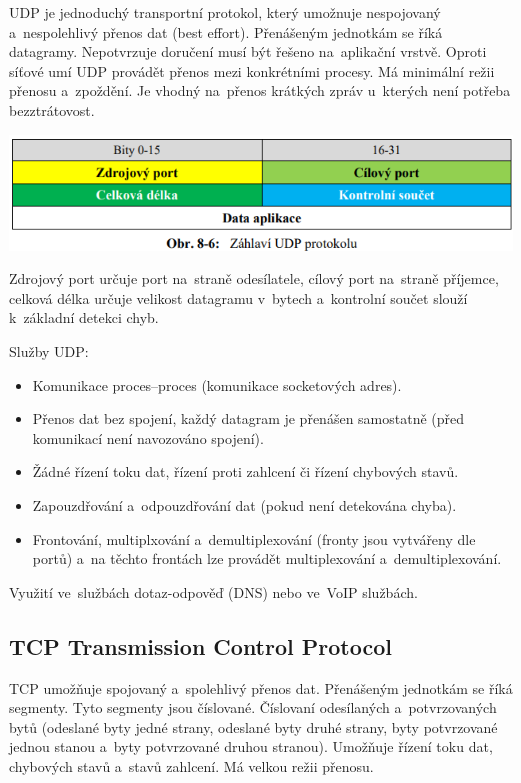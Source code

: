 UDP je jednoduchý transportní protokol, který umožnuje nespojovaný a~nespolehlivý přenos dat (best effort). Přenášeným jednotkám se říká datagramy. Nepotvrzuje doručení musí být řešeno na~aplikační vrstvě. Oproti síťové umí UDP provádět přenos mezi konkrétními procesy. Má minimální režii přenosu a~zpoždění. Je vhodný na~přenos krátkých zpráv u~kterých není potřeba bezztrátovost.

\begin{center}
\includegraphics[scale = 0.5]{images/-050.png}
\end{center}

Zdrojový port určuje port na~straně odesílatele, cílový port na~straně příjemce, celková délka určuje velikost datagramu v~bytech a~kontrolní součet slouží k~základní detekci chyb.

Služby UDP:
\begin{itemize}[noitemsep]
    \item Komunikace proces--proces (komunikace socketových adres).
    \item Přenos dat bez spojení, každý datagram je přenášen samostatně (před komunikací není navozováno spojení).
    \item Žádné řízení toku dat, řízení proti zahlcení či řízení chybových stavů.
    \item Zapouzdřování a~odpouzdřování dat (pokud není detekována chyba).
    \item Frontování, multiplxování a~demultiplexování (fronty jsou vytvářeny dle portů) a~na těchto frontách lze provádět multiplexování a~demultiplexování.
\end{itemize}

Využití ve~službách dotaz-odpověď (DNS) nebo ve~VoIP službách.

\subsection{TCP Transmission Control Protocol}

TCP umožňuje spojovaný a~spolehlivý přenos dat. Přenášeným jednotkám se říká segmenty. Tyto segmenty jsou číslované. Číslovaní odesílaných a~potvrzovaných bytů (odeslané byty jedné strany, odeslané byty druhé strany, byty potvrzované jednou stanou a~byty potvrzované druhou stranou). Umožňuje řízení toku dat, chybových stavů a~stavů zahlcení. Má velkou režii přenosu.

